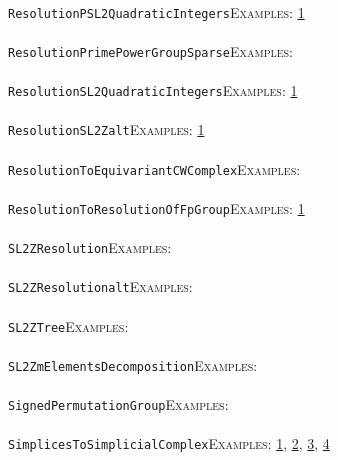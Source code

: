 \documentclass[a4paper,11pt]{report}
\begin{document}
{{ \\
 \texttt{ResolutionPSL2QuadraticIntegers}{\nobreakspace}{\nobreakspace}{\nobreakspace}{\nobreakspace}\textsc{Examples:} \href{tutorial/chap10.html} {1}{\nobreakspace} \\
 \\
 \texttt{ResolutionPrimePowerGroupSparse}{\nobreakspace}{\nobreakspace}{\nobreakspace}{\nobreakspace}\textsc{Examples:} \\
 \\
 \texttt{ResolutionSL2QuadraticIntegers}{\nobreakspace}{\nobreakspace}{\nobreakspace}{\nobreakspace}\textsc{Examples:} \href{tutorial/chap10.html} {1}{\nobreakspace} \\
 \\
 \texttt{ResolutionSL2Z{\textunderscore}alt}{\nobreakspace}{\nobreakspace}{\nobreakspace}{\nobreakspace}\textsc{Examples:} \href{tutorial/chap10.html} {1}{\nobreakspace} \\
 \\
 \texttt{ResolutionToEquivariantCWComplex}{\nobreakspace}{\nobreakspace}{\nobreakspace}{\nobreakspace}\textsc{Examples:} \\
 \\
 \texttt{ResolutionToResolutionOfFpGroup}{\nobreakspace}{\nobreakspace}{\nobreakspace}{\nobreakspace}\textsc{Examples:} \href{../www/SideLinks/About/aboutArithmetic.html} {1}{\nobreakspace} \\
 \\
 \texttt{SL2ZResolution}{\nobreakspace}{\nobreakspace}{\nobreakspace}{\nobreakspace}\textsc{Examples:} \\
 \\
 \texttt{SL2ZResolution{\textunderscore}alt}{\nobreakspace}{\nobreakspace}{\nobreakspace}{\nobreakspace}\textsc{Examples:} \\
 \\
 \texttt{SL2ZTree}{\nobreakspace}{\nobreakspace}{\nobreakspace}{\nobreakspace}\textsc{Examples:} \\
 \\
 \texttt{SL2ZmElementsDecomposition}{\nobreakspace}{\nobreakspace}{\nobreakspace}{\nobreakspace}\textsc{Examples:} \\
 \\
 \texttt{SignedPermutationGroup}{\nobreakspace}{\nobreakspace}{\nobreakspace}{\nobreakspace}\textsc{Examples:} \\
 \\
 \texttt{SimplicesToSimplicialComplex}{\nobreakspace}{\nobreakspace}{\nobreakspace}{\nobreakspace}\textsc{Examples:} \href{tutorial/chap3.html} {1}{\nobreakspace}, \href{../www/SideLinks/About/aboutCoveringSpaces.html} {2}{\nobreakspace}, \href{../www/SideLinks/About/aboutCoverinSpaces.html} {3}{\nobreakspace}, \href{../www/SideLinks/About/aboutCubical.html} {4}{\nobreakspace} \\
}}
\end{document}
